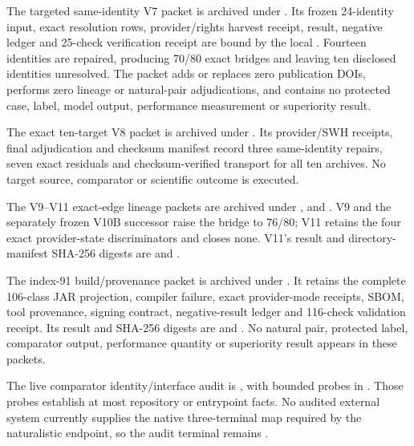 The targeted same-identity V7 packet is archived under
. Its frozen 24-identity
input, exact resolution rows, provider/rights harvest receipt, result, negative
ledger and 25-check verification receipt are bound by the local
. Fourteen identities are repaired, producing 70/80 exact
bridges and leaving ten disclosed identities unresolved. The packet adds or
replaces zero publication DOIs, performs zero lineage or natural-pair
adjudications, and contains no protected case, label, model output, performance
measurement or superiority result.

The exact ten-target V8 packet is archived under
. Its provider/SWH
receipts, final adjudication and checksum manifest record three same-identity
repairs, seven exact residuals and checksum-verified transport for all ten
archives. No target source, comparator or scientific outcome is executed.

The V9--V11 exact-edge lineage packets are archived under
,
 and
.  V9 and the
separately frozen V10B successor raise the bridge to 76/80; V11 retains the
four exact provider-state discriminators and closes none.  V11's result and
directory-manifest SHA-256 digests are
and
.

The index-91 build/provenance packet is archived under
.  It retains
the complete 106-class JAR projection, compiler failure, exact provider-mode
receipts, SBOM, tool provenance, signing contract, negative-result ledger and
116-check validation receipt.  Its result and  SHA-256 digests
are
and
.
No natural pair, protected label, comparator output, performance quantity or
superiority result appears in these packets.

The live comparator identity/interface audit is
,
with bounded probes in
.
Those probes establish at most repository or entrypoint facts. No audited
external system currently supplies the native three-terminal map required by
the naturalistic endpoint, so the audit terminal remains
.

